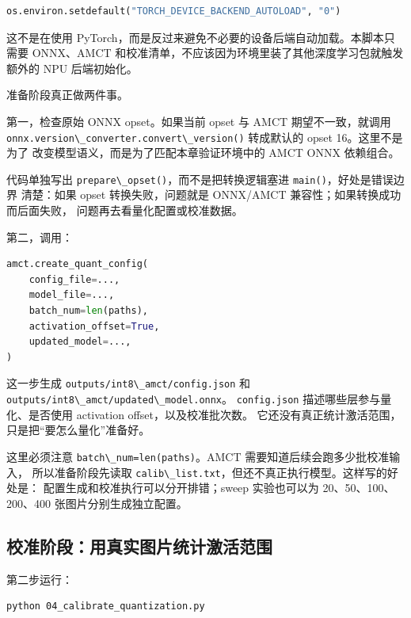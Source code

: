 \begin{lstlisting}[language=Python]
os.environ.setdefault("TORCH_DEVICE_BACKEND_AUTOLOAD", "0")
\end{lstlisting}

这不是在使用
PyTorch，而是反过来避免不必要的设备后端自动加载。本脚本只需要 ONNX、AMCT
和校准清单，不应该因为环境里装了其他深度学习包就触发额外的 NPU
后端初始化。

准备阶段真正做两件事。

第一，检查原始 ONNX opset。如果当前 opset 与 AMCT 期望不一致，就调用
\passthrough{\lstinline!onnx.version\_converter.convert\_version()!}
转成默认的 opset 16。这里不是为了
改变模型语义，而是为了匹配本章验证环境中的 AMCT ONNX 依赖组合。

代码单独写出
\passthrough{\lstinline!prepare\_opset()!}，而不是把转换逻辑塞进
\passthrough{\lstinline!main()!}，好处是错误边界 清楚：如果 opset
转换失败，问题就是 ONNX/AMCT 兼容性；如果转换成功而后面失败，
问题再去看量化配置或校准数据。

第二，调用：

\begin{lstlisting}[language=Python]
amct.create_quant_config(
    config_file=...,
    model_file=...,
    batch_num=len(paths),
    activation_offset=True,
    updated_model=...,
)
\end{lstlisting}

这一步生成 \passthrough{\lstinline!outputs/int8\_amct/config.json!} 和
\passthrough{\lstinline!outputs/int8\_amct/updated\_model.onnx!}。
\passthrough{\lstinline!config.json!} 描述哪些层参与量化、是否使用
activation offset，以及校准批次数。
它还没有真正统计激活范围，只是把``要怎么量化''准备好。

这里必须注意 \passthrough{\lstinline!batch\_num=len(paths)!}。AMCT
需要知道后续会跑多少批校准输入， 所以准备阶段先读取
\passthrough{\lstinline!calib\_list.txt!}，但还不真正执行模型。这样写的好处是：
配置生成和校准执行可以分开排错；sweep 实验也可以为 20、50、100、200、400
张图片分别生成独立配置。

\subsection{校准阶段：用真实图片统计激活范围}\label{ux6821ux51c6ux9636ux6bb5ux7528ux771fux5b9eux56feux7247ux7edfux8ba1ux6fc0ux6d3bux8303ux56f4}

第二步运行：

\begin{lstlisting}[language=bash]
python 04_calibrate_quantization.py
\end{lstlisting}

